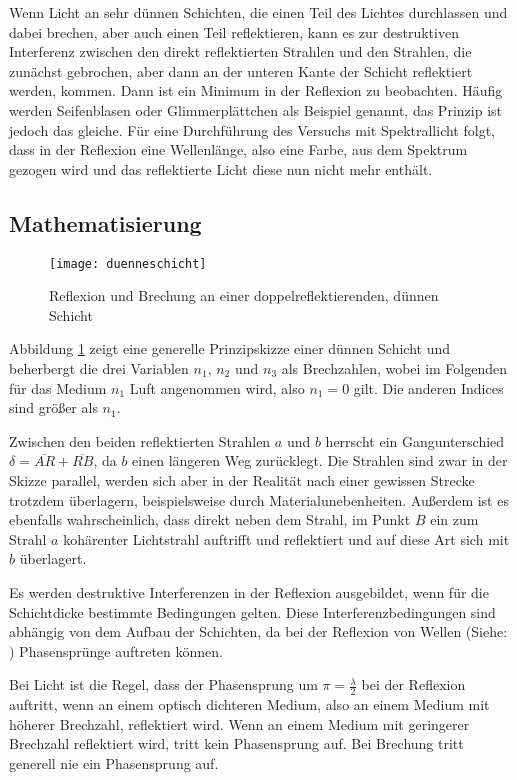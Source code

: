 Wenn Licht an sehr dünnen Schichten, die einen Teil des Lichtes durchlassen und dabei brechen, aber auch einen Teil reflektieren, kann es zur destruktiven Interferenz zwischen den direkt reflektierten Strahlen und den Strahlen, die zunächst gebrochen, aber dann an der unteren Kante der Schicht reflektiert werden, kommen. Dann ist ein Minimum in der Reflexion zu beobachten. Häufig werden Seifenblasen oder Glimmerplättchen als Beispiel genannt, das Prinzip ist jedoch das gleiche. Für eine Durchführung des Versuchs mit Spektrallicht folgt, dass in der Reflexion eine Wellenlänge, also eine Farbe, \glqq aus dem Spektrum gezogen wird\grqq{} und das reflektierte Licht diese nun nicht mehr enthält.

\subsection{Mathematisierung}

\begin{figure}[!h]
	\centering
	\texttt{[image: duenneschicht]}
	\caption{Reflexion und Brechung an einer doppelreflektierenden, dünnen Schicht}
	\label{fig:duenneschicht}
\end{figure}

Abbildung \ref{fig:duenneschicht} zeigt eine generelle Prinzipskizze einer dünnen Schicht und beherbergt die drei Variablen $n_1$, $n_2$ und $n_3$ als Brechzahlen, wobei im Folgenden für das Medium $n_1$ Luft angenommen wird, also $n_1=0$ gilt. Die anderen Indices sind größer als $n_1$.

Zwischen den beiden reflektierten Strahlen $a$ und $b$ herrscht ein Gangunterschied $\delta = \overline{AR} + \overline{RB}$, da $b$ einen längeren Weg zurücklegt. Die Strahlen sind zwar in der Skizze parallel, werden sich aber in der Realität nach einer gewissen Strecke trotzdem überlagern, beispielsweise durch Materialunebenheiten. Außerdem ist es ebenfalls wahrscheinlich, dass direkt neben dem Strahl, im Punkt $B$ ein zum Strahl $a$ kohärenter Lichtstrahl auftrifft und reflektiert und auf diese Art sich mit $b$ überlagert.

Es werden destruktive Interferenzen in der Reflexion ausgebildet, wenn für die Schichtdicke bestimmte Bedingungen gelten. Diese Interferenzbedingungen sind abhängig von dem Aufbau der Schichten, da bei der Reflexion von Wellen (Siehe: ) Phasensprünge auftreten können.

Bei Licht ist die Regel, dass der Phasensprung um $\pi = \frac{\lambda}{2}$ bei der Reflexion auftritt, wenn an einem optisch dichteren Medium, also an einem Medium mit höherer Brechzahl, reflektiert wird. Wenn an einem Medium mit geringerer Brechzahl reflektiert wird, tritt kein Phasensprung auf. Bei Brechung tritt generell nie ein Phasensprung auf.

